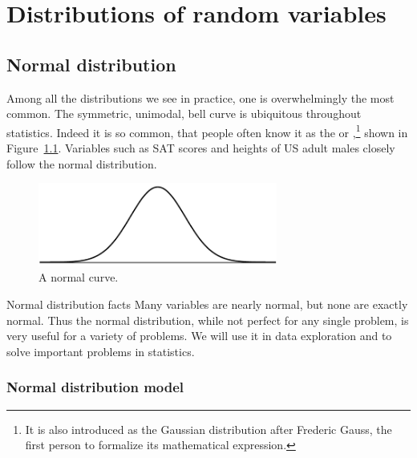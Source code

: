 \chapter{Distributions of random variables}
\label{ch_distributions}
\renewcommand{\chapterfolder}{ch_distributions}




\section{Normal distribution}
\label{normalDist}


Among all the distributions we see in practice,
one is overwhelmingly the most common.
The symmetric, unimodal, bell curve is ubiquitous
throughout statistics.
Indeed it is so common, that people often know it as the
 or
,\footnote{It
  is also introduced as the Gaussian distribution after Frederic
  Gauss, the first person to formalize its mathematical
  expression.}
shown in Figure~\ref{simpleNormal}.
Variables such as SAT scores and heights of US adult males
closely follow the normal distribution.

\begin{figure}[h]
\centering
\includegraphics[width=0.7\textwidth]{ch_distributions/figures/simpleNormal/simpleNormal}
\caption{A normal curve.}
\label{simpleNormal}
\end{figure}

\begin{onebox}{Normal distribution facts}
  Many variables are nearly normal, but none are exactly normal.
  Thus the normal distribution, while not perfect for any single
  problem, is very useful for a variety of problems.
  We will use it in data exploration and to solve important
  problems in statistics.
\end{onebox}


\subsection{Normal distribution model}

